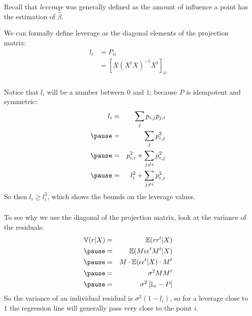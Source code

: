 \begin{frame}[fragile] \frametitle{}

Recall that {\it leverage} was generally defined as the
amount of influence a point has the estimation of
$\widehat{\beta}$.

\pause We can formally define leverage as the diagonal
elements of the projection matrix:
\begin{align*}
l_i &= P_{ii} \\
&= \left[ X (X^t X)^{-1} X^t \right]_{ii}
\end{align*}

\end{frame}

\begin{frame}[fragile] \frametitle{}

Notice that $l_{i}$ will be a number between $0$ and $1$;
because $P$ is idempotent and symmetric:
\begin{eqnarray*}
l_{i} &=& \sum_j p_{i,j} p_{j,i} \\ \pause
&=& \sum_j p_{i,j}^2 \\ \pause
&=& p_{i,i}^2 + \sum_{j \neq i} p_{i,j}^2 \\ \pause
&=& l_{i}^2 + \sum_{j \neq i} p_{i,j}^2
\end{eqnarray*}
\pause So then $l_i \geq l_i^2$, which shows the bounds on the
leverage values.

\end{frame}

\begin{frame}[fragile] \frametitle{}

To see why we use the diagonal of the projection matrix,
look at the variance of the residuals:
\begin{eqnarray*}
\mathbb{V} (r | X) &=& \mathbb{E} (r r^t | X) \\ \pause
&=& \mathbb{E} (M\epsilon \epsilon^t M^t | X) \\ \pause
&=& M \cdot \mathbb{E} (\epsilon \epsilon^t| X) \cdot  M^t \\ \pause
&=& \sigma^2 M M^t \\ \pause
&=& \sigma^2 \left[ \mathbb{I}_n - P \right]
\end{eqnarray*}
\pause So the variance of an individual residual is $\sigma^2(1 - l_i)$, so
for a leverage close to $1$ the regression line will generally pass
very close to the point $i$.

\end{frame}

